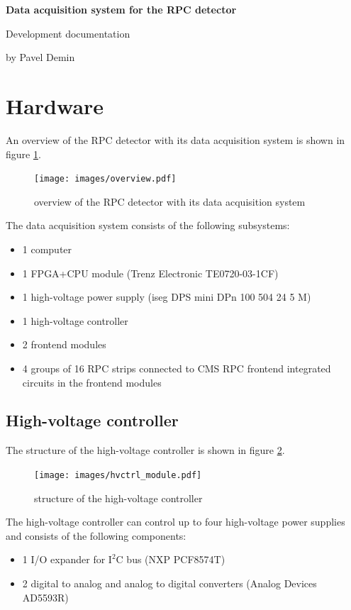 \documentclass[12pt, a4paper]{article}
\begin{document}
\begin{flushright}
\bfseries\upshape\Large
Data acquisition system for the RPC detector

Development documentation

by Pavel Demin
\end{flushright}

\tableofcontents

\section{Hardware}

An overview of the RPC detector with its data acquisition system is shown in figure \ref{fig:overview}.

\begin{figure}[h!]
  \centering
  \texttt{[image: images/overview.pdf]}
  \caption{overview of the RPC detector with its data acquisition system}
  \label{fig:overview}
\end{figure}

The data acquisition system consists of the following subsystems:
\begin{itemize}[nosep]
  \item 1 computer
  \item 1 FPGA+CPU module (Trenz Electronic TE0720-03-1CF) \cite{te0720}
  \item 1 high-voltage power supply (iseg DPS mini DPn 100 504 24 5 M) \cite{dpsmini}
  \item 1 high-voltage controller
  \item 2 frontend modules \cite{rpcfesch}
  \item 4 groups of 16 RPC strips connected to CMS RPC frontend integrated circuits \cite{rpcnim2000} in the frontend modules
\end{itemize}

\subsection{High-voltage controller}

The structure of the high-voltage controller is shown in figure \ref{fig:hvctrl_module}.

\begin{figure}[h!]
  \centering
  \texttt{[image: images/hvctrl\_module.pdf]}
  \caption{structure of the high-voltage controller}
  \label{fig:hvctrl_module}
\end{figure}

The high-voltage controller can control up to four high-voltage power supplies and consists of the following components:
\begin{itemize}[nosep]
  \item 1 I/O expander for $\text{I}^\text{2}\text{C}$ bus (NXP PCF8574T) \cite{pcf8574t}
  \item 2 digital to analog and analog to digital converters (Analog Devices AD5593R) \cite{ad5593r}
\end{itemize}
\end{document}
